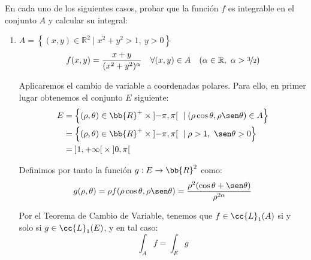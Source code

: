 \begin{ejercicio}
    En cada uno de los siguientes casos, probar que la función \( f \) es integrable en el conjunto \( A \) y calcular su integral:

    \begin{enumerate}
        \item \( A = \left\{ (x, y) \in \mathbb{R}^2 \mid x^2 + y^2 > 1 ,~y > 0 \right\} \)
        \[ f(x, y) = \frac{x + y}{(x^2 + y^2)^\alpha} \quad \forall (x, y) \in A \quad (\alpha \in \mathbb{R},~\alpha > \nicefrac{3}{2}) \]

        Aplicaremos el cambio de variable a coordenadas polares. Para ello, en primer
        lugar obtenemos el conjunto $E$ siguiente:
        \begin{align*}
            E &= \left\{ (\rho, \theta) \in \bb{R}^+\times \left]-\pi, \pi\right[ ~\mid (\rho\cos\theta, \rho\sen\theta) \in A \right\} \\
            &= \left\{ (\rho, \theta) \in \bb{R}^+\times \left]-\pi, \pi\right[ ~\mid \rho > 1 ,~\sen\theta > 0 \right\} \\
            &= \left] 1, +\infty \right[ \times \left] 0, \pi \right[
        \end{align*}

        Definimos por tanto la función $g: E \to \bb{R}^2$ como:
        \begin{equation*}
            g(\rho, \theta) = \rho f(\rho\cos\theta, \rho\sen\theta) = \frac{\rho^2(\cos\theta + \sen\theta)}{\rho^{2\alpha}}
        \end{equation*}

        Por el Teorema de Cambio de Variable, tenemos que $f\in \cc{L}_1(A)$ si y solo si $g\in \cc{L}_1(E)$, y en tal caso:
        \begin{equation*}
            \int_A f = \int_E g
        \end{equation*}


\end{enumerate}
\end{ejercicio}

